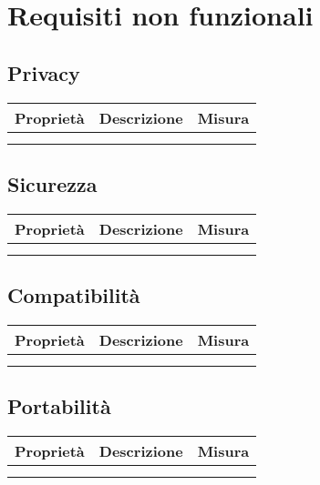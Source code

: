 \chapter{Requisiti non funzionali}

\section{Privacy}
\begin{tabular}{|l|l|l|}
    \hline
    \multicolumn{1}{|c|}{\textbf{Proprietà}} & \textbf{Descrizione} & \textbf{Misura} \\
    \hline
     &  & \\
    \hline
     &  & \\
    \hline
\end{tabular}

\section{Sicurezza}    
\begin{tabular}{|l|l|l|}
    \hline
    \multicolumn{1}{|c|}{\textbf{Proprietà}} & \textbf{Descrizione} & \textbf{Misura} \\
    \hline
     &  & \\
    \hline
     &  & \\
    \hline
\end{tabular}

\section{Compatibilità}
\begin{tabular}{|l|l|l|}
    \hline
    \multicolumn{1}{|c|}{\textbf{Proprietà}} & \textbf{Descrizione} & \textbf{Misura} \\
    \hline
     &  & \\
    \hline
     &  & \\
    \hline
\end{tabular}

\section{Portabilità}
\begin{tabular}{|l|l|l|}
    \hline
    \multicolumn{1}{|c|}{\textbf{Proprietà}} & \textbf{Descrizione} & \textbf{Misura} \\
    \hline
     &  & \\
    \hline
     &  & \\
    \hline
\end{tabular}

